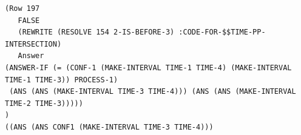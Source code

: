 \begin{lstlisting}[caption=SNARK detecting the configuration integrity violation., label=lst:not-conf-int-a,captionpos=b] 
(Row 197
   FALSE
   (REWRITE (RESOLVE 154 2-IS-BEFORE-3) :CODE-FOR-$$TIME-PP-INTERSECTION)
   Answer 
(ANSWER-IF (= (CONF-1 (MAKE-INTERVAL TIME-1 TIME-4) (MAKE-INTERVAL TIME-1 TIME-3)) PROCESS-1)
 (ANS (ANS (MAKE-INTERVAL TIME-3 TIME-4))) (ANS (ANS (MAKE-INTERVAL TIME-2 TIME-3)))))
)
((ANS (ANS CONF1 (MAKE-INTERVAL TIME-3 TIME-4)))

\end{lstlisting}

